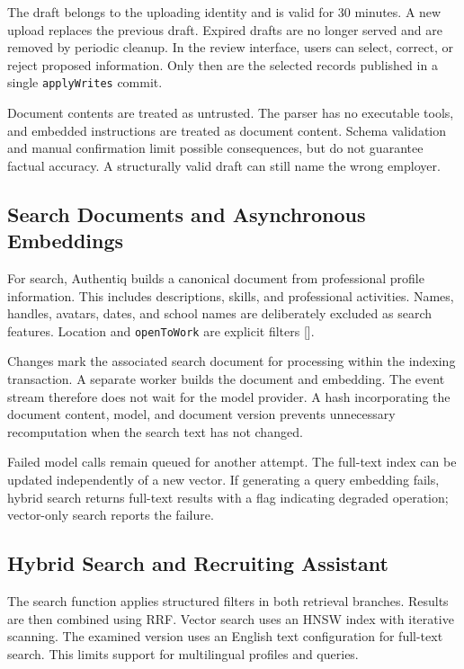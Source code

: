 \documentclass[11pt,a4paper]{article}
\newcommand{\code}[1]{\texttt{#1}}
\newcommand{\reflink}[1]{\hyperlink{ref:#1}{#1}}
\newcommand{\refsep}{}
\newcommand{\refs}[1]{\begingroup
  \gdef\refsep{}%
  \renewcommand*{\do}[1]{\refsep\reflink{##1}\gdef\refsep{, }}%
  [\docsvlist{#1}]\endgroup}
\begin{document}
The draft belongs to the uploading identity and is valid for 30 minutes. A new upload replaces the previous draft. Expired drafts are no longer served and are removed by periodic cleanup. In the review interface, users can select, correct, or reject proposed information. Only then are the selected records published in a single \code{applyWrites} commit.

Document contents are treated as untrusted. The parser has no executable tools, and embedded instructions are treated as document content. Schema validation and manual confirmation limit possible consequences, but do not guarantee factual accuracy. A structurally valid draft can still name the wrong employer.

\subsection{Search Documents and Asynchronous Embeddings}

For search, Authentiq builds a canonical document from professional profile information. This includes descriptions, skills, and professional activities. Names, handles, avatars, dates, and school names are deliberately excluded as search features. Location and \code{openToWork} are explicit filters \refs{P6}.

Changes mark the associated search document for processing within the indexing transaction. A separate worker builds the document and embedding. The event stream therefore does not wait for the model provider. A hash incorporating the document content, model, and document version prevents unnecessary recomputation when the search text has not changed.

Failed model calls remain queued for another attempt. The full-text index can be updated independently of a new vector. If generating a query embedding fails, hybrid search returns full-text results with a flag indicating degraded operation; vector-only search reports the failure.

\subsection{Hybrid Search and Recruiting Assistant}

The search function applies structured filters in both retrieval branches. Results are then combined using RRF. Vector search uses an HNSW index with iterative scanning. The examined version uses an English text configuration for full-text search. This limits support for multilingual profiles and queries.
\end{document}
